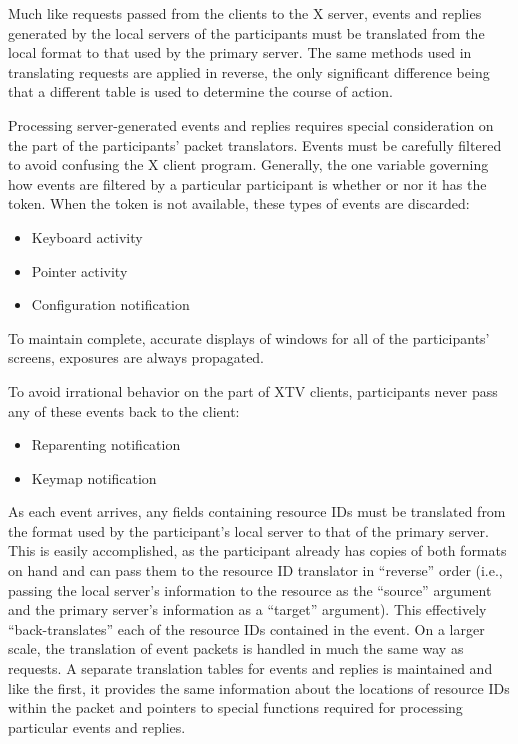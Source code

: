 Much like requests passed from the clients to the X server, events
and replies generated by the local servers of the participants must be translated
from the local format to that used by the primary server. The same
methods used in translating requests are applied in reverse, the only
significant difference being that a different table is used to
determine the course of action.

Processing server-generated events and replies requires special consideration on
the part of the participants' packet translators.  Events must be
carefully filtered to avoid confusing the X client program.  Generally,
the one variable governing how events are filtered by a particular
participant is whether or nor it has the token.  When the token is not
available, these types of events are discarded:

\begin{itemize}
\item Keyboard activity
\item Pointer activity
\item Configuration notification
\end{itemize}

To maintain complete, accurate displays of windows for all of the
participants' screens, exposures are always propagated.  

To avoid irrational behavior on the part of XTV clients, participants
never pass any of these events back to the client:

\begin{itemize}
\item Reparenting notification
\item Keymap notification
\end{itemize}

As each event arrives, any fields containing resource IDs must be
translated from the format used by the participant's local server to
that of the primary server.  This is easily accomplished, as the
participant already has copies of both formats on hand and can pass
them to the resource ID translator in ``reverse'' order (i.e., passing
the local server's information to the resource as the ``source''
argument and the primary server's information as a ``target''
argument).  This effectively ``back-translates'' each of the resource
IDs contained in the event.  On a larger scale, the translation of
event packets is handled in much the same way as requests.  A separate
translation tables for events and replies is maintained and like the first, it
provides the same information about the locations of resource IDs
within the packet and pointers to special functions required for
processing particular events and replies.


